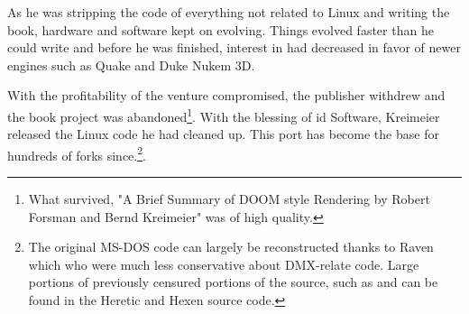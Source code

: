 \par
 As he was stripping the code of everything not related to Linux and writing the book, hardware and software kept on evolving. Things evolved faster than he could write and before he was finished, interest in \doom{} had decreased in favor of newer engines such as Quake and Duke Nukem 3D.\\
 \par
  With the profitability of the venture compromised, the publisher withdrew and the book project was abandoned\footnote{What survived, "A Brief Summary of DOOM style Rendering by Robert Forsman and Bernd Kreimeier" was of high quality.}. With the blessing of id Software, Kreimeier released the Linux code he had cleaned up. This port has become the base for hundreds of forks since.\footnote{The original MS-DOS code can largely be reconstructed thanks to Raven which who were much less conservative about DMX-relate code. Large portions of previously censured portions of the source, such as  and  can be found in the Heretic and Hexen source code.}.\\
 \par  


